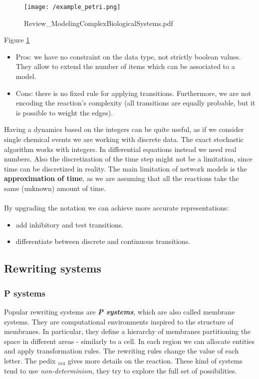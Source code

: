  \begin{figure}
    \centering
    \texttt{[image: /example\_petri.png]}
    \caption{Review\_ModelingComplexBiologicalSystems.pdf}
    \label{fig:expetri}
  \end{figure}

\noindent
  Figure \ref{fig:expetri}
  \begin{itemize}
  \item Pros: we have no constraint on the data type, not strictly boolean values. They allow to extend the number of items which can be associated to a model.
  \item Cons: there is no fixed rule for applying transitions. Furthermore, we are not encoding the reaction's complexity (all transitions are equally probable, but it is possible to weight the edges).
  \end{itemize}

  \noindent
  Having a dynamics based on the integers can be quite useful, as if we consider single chemical events we are working with discrete data.
  The exact stochastic algorithm works with integers.
  In differential equations instead we need real numbers.
  Also the discretization of the time step might not be a limitation, since time can be discretized in reality.
  The main limitation of network models is the \textbf{approximation of time},  as we are assuming that all the reactions take the same (unknown) amount of time.
  \\
  \\
  \noindent
 By upgrading the notation we can achieve more accurate representations:
  \begin{itemize}
    \item add inhibitory and test transitions.
    \item differentiate between discrete and continuous transitions.
  \end{itemize}

  \subsection{Rewriting systems}

    \subsubsection{P systems}
    Popular rewriting systems are \textbf{\emph{P systems}}, which are also called membrane systems.
    They are computational environments inspired to the structure of membranes.
    In particular, they define a hierarchy of membranes partitioning the space in different areas - similarly to a cell.
    In each region we can allocate entities and apply transformation rules.
    The rewriting rules change the value of each letter.
    The pedix \(_{in4}\) gives more details on the reaction.
    These kind of systems tend to use \emph{non-determinism}, they try to explore the full set of possibilities.


